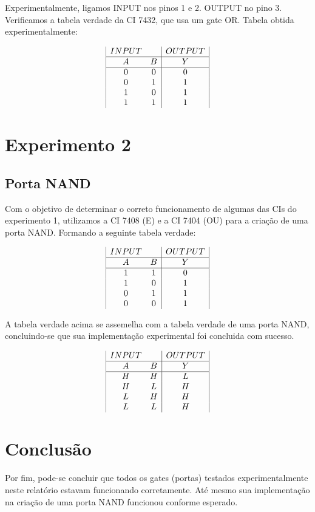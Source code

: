 \documentclass{article}
\begin{document}
Experimentalmente, ligamos INPUT nos pinos 1 e 2. OUTPUT no pino 3. Verificamos a tabela verdade da CI 7432, que usa um gate OR. Tabela obtida experimentalmente:

\begin{displaymath}
\begin{array}{|c c|c|}
INPUT & & OUTPUT\\
\hline
A & B & Y\\
\hline %
0 & 0 & 0\\
0 & 1 & 1\\
1 & 0 & 1\\
1 & 1 & 1\\
\end{array}
\end{displaymath}

\section{Experimento 2}
\subsection{Porta NAND}
Com o objetivo de determinar o correto funcionamento de algumas das CIs do experimento 1, utilizamos a CI 7408 (E) e a CI 7404 (OU) para a criação de uma porta NAND. Formando a seguinte tabela verdade:

\begin{displaymath}
\begin{array}{|c c|c|}
INPUT & & OUTPUT\\
\hline
A & B & Y\\
\hline %
1 & 1 & 0\\
1 & 0 & 1\\
0 & 1 & 1\\
0 & 0 & 1\\
\end{array}
\end{displaymath}

A tabela verdade acima se assemelha com a tabela verdade de uma porta NAND, concluindo-se que sua implementação experimental foi concluida com sucesso.

\begin{displaymath}
\begin{array}{|c c|c|}
INPUT & & OUTPUT\\
\hline
A & B & Y\\
\hline %
H & H & L\\
H & L & H\\
L & H & H\\
L & L & H\\
\end{array}
\end{displaymath}


\section{Conclusão}

Por fim, pode-se concluir que todos os gates (portas) testados experimentalmente neste relatório estavam funcionando corretamente. Até mesmo sua implementação na criação de uma porta NAND funcionou conforme esperado.

\medskip
\end{document}
